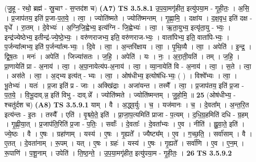 \documentclass[17pt]{extarticle}
\begin{document}
                  \newline
                      (जु॒हू - रथो॒ ब्रह्म॑ - स्रु॒चाꣳ - स॒प्तद॑श च)  \textbf{(A7)} \newline \newline
                                \textbf{ TS 3.5.8.1} \newline
                  उ॒प॒या॒मगृ॑हीत॒ इत्यु॑पया॒म - गृ॒ही॒तः॒ । अ॒सि॒ । प्र॒जाप॑तय॒ इति॑ प्र॒जा-प॒त॒ये॒ । त्वा॒ । ज्योति॑ष्मते । ज्योति॑ष्मन्तम् । गृ॒ह्णा॒मि॒ । दक्षा॑य । द॒क्ष॒वृध॒ इति॑ दक्ष - वृधे᳚ । रा॒तम् । दे॒वेभ्यः॑ । अ॒ग्नि॒जि॒ह्वेभ्य॒ इत्य॑ग्नि - जि॒ह्वेभ्यः॑ । त्वा॒ । ऋ॒ता॒युभ्य॒ इत्यृ॑ता॒यु - भ्यः॒ । इन्द्र॑ज्येष्ठेभ्य॒ इतीन्द्र॑-ज्ये॒ष्ठे॒भ्यः॒ । वरु॑णराजभ्य॒ इति॒ वरु॑णराज-भ्यः॒ । वाता॑पिभ्य॒ इति॒ वाता॑पि-भ्यः॒ । प॒र्जन्या᳚त्मभ्य॒ इति॑ प॒र्जन्या᳚त्म-भ्यः॒ । दि॒वे । त्वा॒ । अ॒न्तरि॑क्षाय । त्वा॒ । पृ॒थि॒व्यै । त्वा॒ । अपेति॑ । इ॒न्द्र॒ । द्वि॒ष॒तः । मनः॑ । अपेति॑ । जिज्या॑सतः । ज॒हि॒ । अपेति॑ । यः । नः॒ । अ॒रा॒ती॒यति॑ । तम् । ज॒हि॒ । प्रा॒णायेति॑ प्रा - अ॒नाय॑ । त्वा॒ । अ॒पा॒नायेत्य॑प-अ॒नाय॑ । त्वा॒ । व्या॒नायेति॑ वि - अ॒नाय॑ । त्वा॒ । स॒ते । त्वा॒ । अस॑ते । त्वा॒ । अ॒द्भ्य इत्य॑त् - भ्यः । त्वा॒ । ओष॑धीभ्य॒ इत्योष॑धि-भ्यः॒ ( ) । विश्वे᳚भ्यः । त्वा॒ । भू॒तेभ्यः॑ । यतः॑ । प्र॒जा इति॑ प्र - जाः । अक्खि॑द्राः । अजा॑यन्त । तस्मै᳚ । त्वा॒ । प्र॒जाप॑तय॒ इति॑ प्र॒जा - प॒त॒ये॒ । वि॒भू॒दाव्.न्न॒ इति॑ विभु - दाव्.न्ने᳚ । ज्योति॑ष्मते । ज्योति॑ष्मन्तम् । जु॒हो॒मि॒ ॥ \textbf{  25 } \newline
                  \newline
                      (ओष॑धीभ्य॒ - श्चतु॑र्दश च)  \textbf{(A8)} \newline \newline
                                \textbf{ TS 3.5.9.1} \newline
                  याम् । वै । अ॒द्ध्व॒र्युः । च॒ । यज॑मानः । च॒ । दे॒वता᳚म् । अ॒न्त॒रि॒त इत्य॑न्तः - इ॒तः । तस्यै᳚ । एति॑ । वृ॒श्च्ये॒ते॒ इति॑ । प्रा॒जा॒प॒त्यमिति॑ प्राजा - प॒त्यम् । द॒धि॒ग्र॒हमिति॑ दधि - ग्र॒हम् । गृ॒ह्णी॒या॒त् । प्र॒जाप॑ति॒रिति॑ प्र॒जा - प॒तिः॒ । सर्वाः᳚ । दे॒वताः᳚ । दे॒वता᳚भ्यः । ए॒व । नीति॑ । ह्नु॒वा॒ते॒ इति॑ । ज्ये॒ष्ठः । वै । ए॒षः । ग्रहा॑णाम् । यस्य॑ । ए॒षः । गृ॒ह्यते᳚ । ज्यैष्ट्य᳚म् । ए॒व । ग॒च्छ॒ति॒ । सर्वा॑साम् । वै । ए॒तत् । दे॒वता॑नाम् । रू॒पम् । यत् । ए॒षः । ग्रहः॑ । यस्य॑ । ए॒षः । गृ॒ह्यते᳚ । सर्वा॑णि । ए॒व । ए॒न॒म् । रू॒पाणि॑ । प॒शू॒नाम् । उपेति॑ । ति॒ष्ठ॒न्ते॒ । उ॒प॒या॒मगृ॑हीत॒ इत्यु॑पया॒म - गृ॒ही॒तः॒ । \textbf{  26} \newline
                  \newline
                                \textbf{ TS 3.5.9.2} \newline
\end{document}
